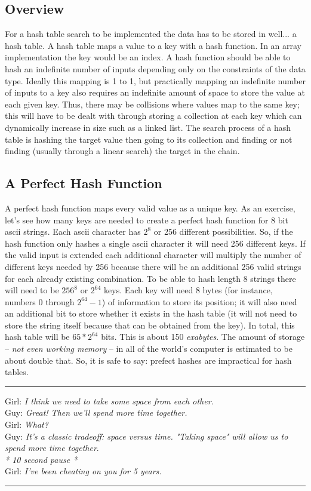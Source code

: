 \documentclass[letterpaper, 10pt]{article}
\begin{document}
\subsection{Overview}
For a hash table search to be implemented the data has to be stored in well... a hash table. A hash table maps
a value to a key with a hash function. In an array implementation the key would be an index. A hash function
should be able to hash an indefinite number of inputs depending only on the constraints of the data type. 
Ideally this mapping is 1 to 1, but practically mapping an indefinite number of inputs to a key also requires
an indefinite amount of space to store the value at each given key. Thus, there may be collisions
where values map to the same key; this will have to be dealt with through storing a collection at each key
which can dynamically increase in size such as a linked list. The search process of a hash table is
hashing the target value then going to its collection and finding or not finding (usually through a linear search)
the target in the chain.
\subsection{A Perfect Hash Function}
A perfect hash function maps every valid value as a unique key. As an exercise, let's see how many keys
are needed to create a perfect hash function for 8 bit ascii strings. Each ascii character
has $2^8$ or 256 different possibilities. So, if the hash function only hashes
a single ascii character it will need 256 different keys. If the valid input is extended each
additional character will multiply the number of different keys needed by 256 because there will be an
additional 256 valid strings for each already existing combination. To be able to hash length 8
strings there will need to be $256^8$ or $2^{64}$ keys. Each key will need 8 bytes
(for instance, numbers 0 through $2^{64}-1$) of information 
to store its position; it will also need an additional bit to store whether it exists in
the hash table (it will not need to store the string itself because that can be obtained from the key).
In total, this hash table will be $65 * 2^{64}$ bits. This is about 150 \textit{exabytes}. The amount
of storage -- \textit{not even working memory} -- in all of the world's computer is estimated to be about double that. So, it is safe to say:
prefect hashes are impractical for hash tables.
\vspace{.25cm}
\hrule
\vspace{.25cm}
\noindent
Girl: \textit{I think we need to take some space from each other.}\\
Guy: \textit{Great! Then we'll spend more time together.}\\
Girl: \textit{What?}\\
Guy: \textit{It's a classic tradeoff: space versus time. "Taking space" will allow us to spend more time together}.\\
\textit{* 10 second pause *}\\
Girl: \textit{I've been cheating on you for 5 years.}\\
\hrule
\vspace{1cm}
\end{document}
